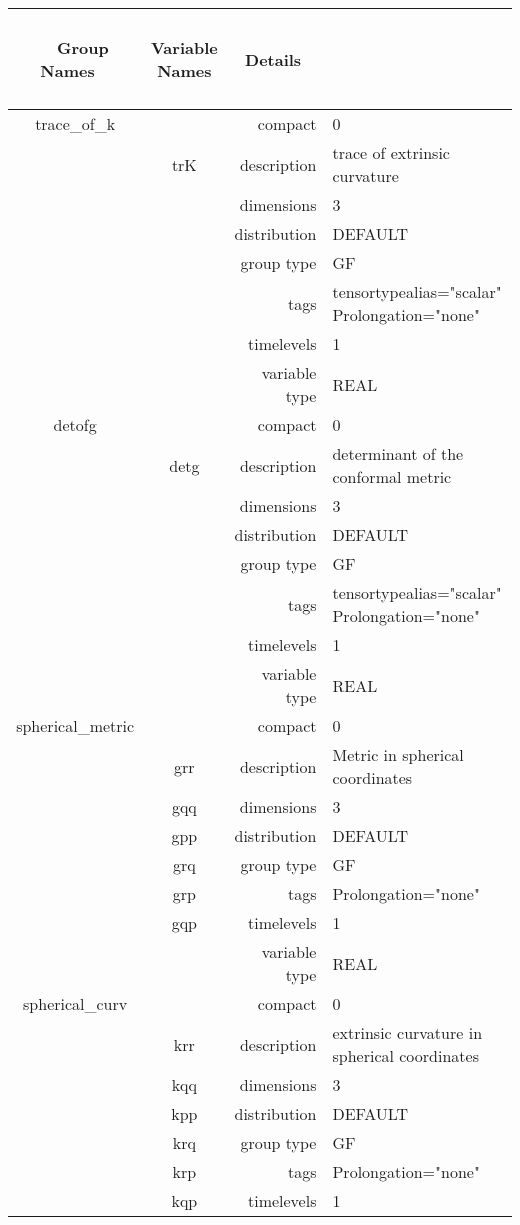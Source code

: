 \documentclass{article}
\begin{document}
\begin{tabular*}{150mm}{|c|c@{\extracolsep{\fill}}|rl|} \hline 
~ {\bf Group Names} ~ & ~ {\bf Variable Names} ~  &{\bf Details} ~ & ~\\ 
\hline 
trace\_of\_k &  & compact & 0 \\ 
 & trK & description & trace of extrinsic curvature \\ 
 &  & dimensions & 3 \\ 
 &  & distribution & DEFAULT \\ 
 &  & group type & GF \\ 
 &  & tags & tensortypealias="scalar" Prolongation="none" \\ 
 &  & timelevels & 1 \\ 
 &  & variable type & REAL \\ 
\hline 
detofg &  & compact & 0 \\ 
 & detg & description & determinant of the conformal metric \\ 
 &  & dimensions & 3 \\ 
 &  & distribution & DEFAULT \\ 
 &  & group type & GF \\ 
 &  & tags & tensortypealias="scalar" Prolongation="none" \\ 
 &  & timelevels & 1 \\ 
 &  & variable type & REAL \\ 
\hline 
spherical\_metric &  & compact & 0 \\ 
 & grr & description & Metric in spherical coordinates \\ 
 & gqq & dimensions & 3 \\ 
 & gpp & distribution & DEFAULT \\ 
 & grq & group type & GF \\ 
 & grp & tags & Prolongation="none" \\ 
 & gqp & timelevels & 1 \\ 
 &  & variable type & REAL \\ 
\hline 
spherical\_curv &  & compact & 0 \\ 
 & krr & description & extrinsic curvature in spherical coordinates \\ 
 & kqq & dimensions & 3 \\ 
 & kpp & distribution & DEFAULT \\ 
 & krq & group type & GF \\ 
 & krp & tags & Prolongation="none" \\ 
 & kqp & timelevels & 1 \\ 

\end{tabular*}
\end{document}
